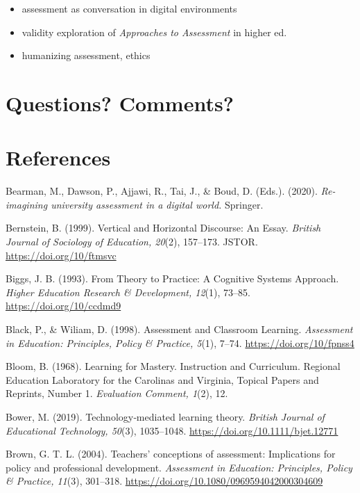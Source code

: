 \documentclass[
]{book}
\providecommand{\tightlist}{%
  \setlength{\itemsep}{0pt}\setlength{\parskip}{0pt}}
\begin{document}
\begin{itemize}
\tightlist
\item
  assessment as conversation in digital environments\\
\item
  validity exploration of \emph{Approaches to Assessment} in higher ed.\\
\item
  humanizing assessment, ethics
\end{itemize}

\hypertarget{questions-comments}{%
\section*{Questions? Comments?}\label{questions-comments}}

\hypertarget{references}{%
\section*{References}\label{references}}

Bearman, M., Dawson, P., Ajjawi, R., Tai, J., \& Boud, D. (Eds.). (2020). \emph{Re-imagining university assessment in a digital world.} Springer.

Bernstein, B. (1999). Vertical and Horizontal Discourse: An Essay. \emph{British Journal of Sociology of Education, 20}(2), 157--173. JSTOR. \url{https://doi.org/10/ftmsvc}

Biggs, J. B. (1993). From Theory to Practice: A Cognitive Systems Approach. \emph{Higher Education Research \& Development, 12}(1), 73--85. \url{https://doi.org/10/ccdmd9}

Black, P., \& Wiliam, D. (1998). Assessment and Classroom Learning. \emph{Assessment in Education: Principles, Policy \& Practice, 5}(1), 7--74. \url{https://doi.org/10/fpnss4}

Bloom, B. (1968). Learning for Mastery. Instruction and Curriculum. Regional Education Laboratory for the Carolinas and Virginia, Topical Papers and Reprints, Number 1. \emph{Evaluation Comment, 1}(2), 12.

Bower, M. (2019). Technology‐mediated learning theory. \emph{British Journal of Educational Technology, 50}(3), 1035--1048. \url{https://doi.org/10.1111/bjet.12771}

Brown, G. T. L. (2004). Teachers' conceptions of assessment: Implications for policy and professional development. \emph{Assessment in Education: Principles, Policy \& Practice, 11}(3), 301--318. \url{https://doi.org/10.1080/0969594042000304609}
\end{document}
